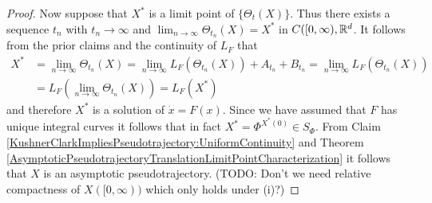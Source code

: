 \begin{proof}
Now suppose that $X^*$ is a limit point of $\lbrace \Theta_t(X) \rbrace$.  Thus there exists a sequence $t_n$ with $t_n \to \infty$ and $\lim_{n \to \infty} \Theta_{t_n}(X) = X^*$
in $C([0,\infty), \mathbb{R}^d$.  It follows from the prior claims and the continuity of $L_F$ that
\begin{align*}
X^* &= \lim_{n \to \infty} \Theta_{t_n}(X) = \lim_{n \to \infty} L_F(\Theta_{t_n}(X)) + A_{t_n} + B_{t_n} = \lim_{n \to \infty} L_F(\Theta_{t_n}(X)) \\
&= L_F(\lim_{n \to \infty}\Theta_{t_n}(X)) = L_F(X^*)
\end{align*}
and therefore $X^*$ is a solution of $\dot{x} = F(x)$.  Since we have assumed that $F$ has unique integral curves it follows that in fact $X^* = \Phi^{X^*(0)} \in S_\Phi$.
From Claim \ref{KushnerClarkImpliesPseudotrajectory:UniformContinuity} and  Theorem \ref{AsymptoticPseudotrajectoryTranslationLimitPointCharacterization} it follows that $X$ is an asymptotic pseudotrajectory.  (TODO: Don't we need relative compactness of $X([0,\infty))$ which only holds under (i)?)


\end{proof}
